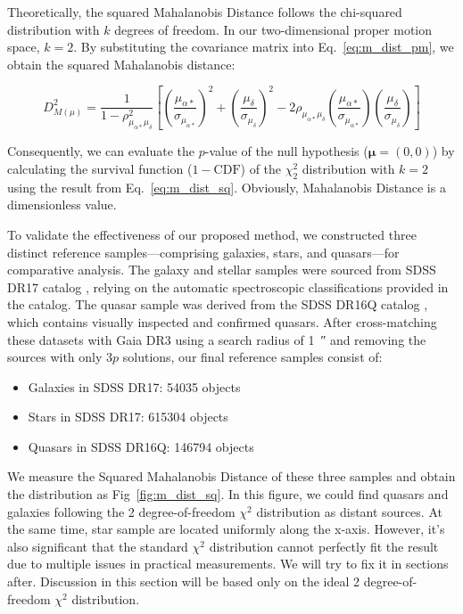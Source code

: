 Theoretically, the squared Mahalanobis Distance follows the chi-squared distribution with $k$ degrees of freedom. In our two-dimensional proper motion space, $k=2$. By substituting the covariance matrix into Eq.~\ref{eq:m_dist_pm}, we obtain the squared Mahalanobis distance:

\begin{equation}
    D^2_{M(\mu)} = \frac{1}{1-\rho^2_{\mu_{\alpha*}\mu_{\delta}}} \left[ \left(\frac{\mu_{\alpha*}}{\sigma_{\mu_{\alpha*}}}\right)^2 + \left(\frac{\mu_{\delta}}{\sigma_{\mu_{\delta}}}\right)^2 - 2\rho_{\mu_{\alpha*}\mu_{\delta}} \left(\frac{\mu_{\alpha*}}{\sigma_{\mu_{\alpha*}}}\right) \left(\frac{\mu_{\delta}}{\sigma_{\mu_{\delta}}}\right) \right]
    \label{eq:m_dist_sq}
\end{equation}

Consequently, we can evaluate the $p$-value of the null hypothesis ($\boldsymbol{\mu} = (0,0)$) by calculating the survival function ($1-\mathrm{CDF}$) of the $\chi^2_2$ distribution with $k=2$ using the result from Eq.~\ref{eq:m_dist_sq}. Obviously, Mahalanobis Distance is a dimensionless value.

To validate the effectiveness of our proposed method, we constructed three distinct reference samples—comprising galaxies, stars, and quasars—for comparative analysis. The galaxy and stellar samples were sourced from SDSS DR17 catalog \citep{abdurroufSeventeenthDataRelease2022}, relying on the automatic spectroscopic classifications provided in the catalog. The quasar sample was derived from the SDSS DR16Q catalog \citep{lykeSloanDigitalSky2020}, which contains visually inspected and confirmed quasars. After cross-matching these datasets with Gaia DR3 using a search radius of \qty{1}{\arcsecond} and removing the sources with only $3p$ solutions, our final reference samples consist of:
\begin{itemize}
    \item Galaxies in SDSS DR17: \num{54035} objects
    \item Stars in SDSS DR17: \num{615304} objects
    \item Quasars in SDSS DR16Q: \num{146794} objects
\end{itemize}

We measure the Squared Mahalanobis Distance of these three samples and obtain the distribution as Fig~\ref{fig:m_dist_sq}. In this figure, we could find quasars and galaxies following the 2 degree-of-freedom $\chi^2$ distribution as distant sources. At the same time, star sample are located uniformly along the x-axis. However, it's also significant that the standard $\chi^2$ distribution cannot perfectly fit the result due to multiple issues in practical measurements. We will try to fix it in sections after. Discussion in this section will be based only on the ideal 2 degree-of-freedom $\chi^2$ distribution.

